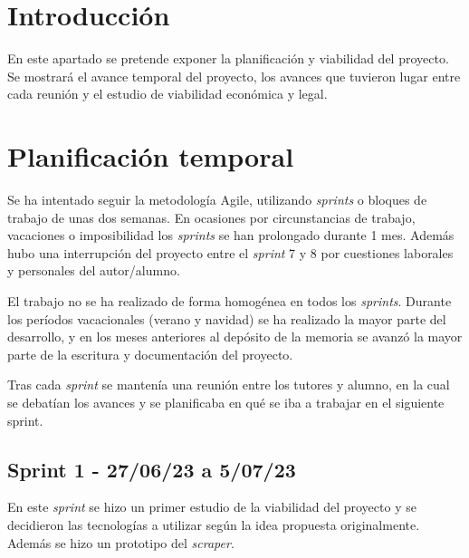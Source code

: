 
\section{Introducción}

En este apartado se pretende exponer la planificación y viabilidad del proyecto. Se mostrará el avance temporal del proyecto, los avances que tuvieron lugar entre cada reunión y el estudio de viabilidad económica y legal.

\section{Planificación temporal}

Se ha intentado seguir la metodología Agile, utilizando \textit{\textit{sprints}} o bloques de trabajo de unas dos semanas. En ocasiones por circunstancias de trabajo, vacaciones o imposibilidad los \textit{sprints} se han prolongado durante 1 mes. Además hubo una interrupción del proyecto entre el \textit{sprint} 7 y 8 por cuestiones laborales y personales del autor/alumno. 

El trabajo no se ha realizado de forma homogénea en todos los \textit{sprints}. Durante los períodos vacacionales (verano y navidad) se ha realizado la mayor parte del desarrollo, y en los meses anteriores al depósito de la memoria se avanzó la mayor parte de la escritura y documentación del proyecto.

Tras cada \textit{sprint} se mantenía una reunión entre los tutores y alumno, en la cual se debatían los avances y se planificaba en qué se iba a trabajar en el siguiente sprint.

\subsection{Sprint 1 - 27/06/23 a 5/07/23}

En este \textit{sprint} se hizo un primer estudio de la viabilidad del proyecto y se decidieron las tecnologías a utilizar según la idea propuesta originalmente. Además se hizo un prototipo del \textit{scraper}.


